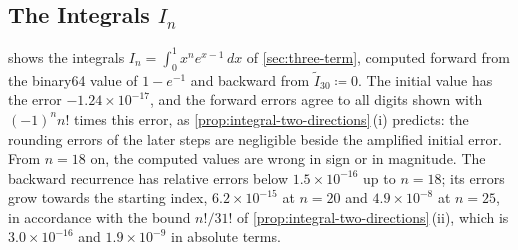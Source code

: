\subsection{The Integrals \texorpdfstring{$I_n$}{In}}

 shows the integrals $I_n=\int_0^1x^ne^{x-1}\,dx$ of \cref{sec:three-term}, computed forward from the binary64 value of $1-e^{-1}$ and backward from $\tilde I_{30}\coloneqq0$. The initial value has the error $-1.24\times10^{-17}$, and the forward errors agree to all digits shown with $(-1)^nn!$ times this error, as \cref{prop:integral-two-directions}\,(i) predicts: the rounding errors of the later steps are negligible beside the amplified initial error. From $n=18$ on, the computed values are wrong in sign or in magnitude. The backward recurrence has relative errors below $1.5\times10^{-16}$ up to $n=18$; its errors grow towards the starting index, $6.2\times10^{-15}$ at $n=20$ and $4.9\times10^{-8}$ at $n=25$, in accordance with the bound $n!/31!$ of \cref{prop:integral-two-directions}\,(ii), which is $3.0\times10^{-16}$ and $1.9\times10^{-9}$ in absolute terms.

\begin{table}
\end{table}

